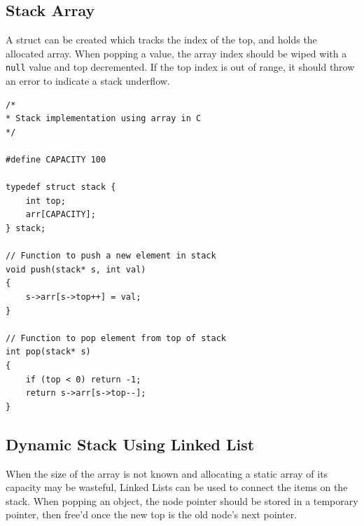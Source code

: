 \documentclass[11pt]{article}
\begin{document}
\subsection{Stack Array}

A struct can be created which tracks the index of the top, and holds the allocated array. When popping a value, the array index should be wiped with a \texttt{null} value and top decremented. If the top index is out of range, it should throw an error to indicate a stack underflow.

\begin{lstlisting}
/*
* Stack implementation using array in C
*/

#define CAPACITY 100

typedef struct stack {
    int top;
    arr[CAPACITY];
} stack;

// Function to push a new element in stack
void push(stack* s, int val)
{
    s->arr[s->top++] = val;
}

// Function to pop element from top of stack
int pop(stack* s)
{    
    if (top < 0) return -1;
    return s->arr[s->top--];
}
\end{lstlisting}

\subsection{Dynamic Stack Using Linked List}

When the size of the array is not known and allocating a static array of its capacity may be wasteful, Linked Lists can be used to connect the items on the stack. When popping an object, the node pointer should be stored in a temporary pointer, then free'd once the new top is the old node's next pointer.
\end{document}
